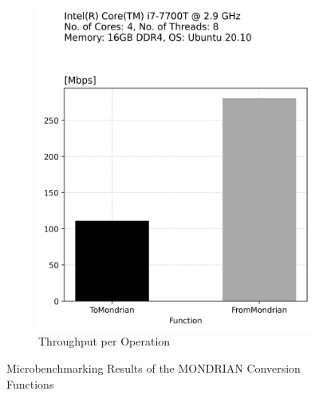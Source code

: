\begin{figure}[t]
\begin{subfigure}[t]{.22\textwidth}
      \includegraphics[width=\linewidth]{img/mondrian_transform_throughput.png}
      \caption{Throughput per Operation}
      \label{fig:sub: Throughput per Operation}
    \end{subfigure}
    \caption{Microbenchmarking Results of the MONDRIAN Conversion Functions}
    \label{fig:Performance of MONDRIAN Conversion Functions}
\end{figure}

